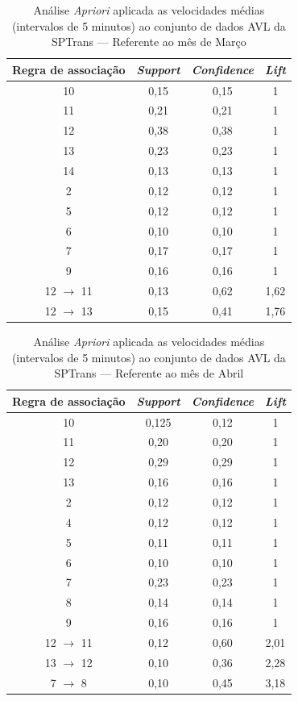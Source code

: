 \documentclass[
	12pt,				%
	oneside,			%
	a4paper,			%
	english,			%
	brazil				%
	]{abntex2ppgsi}
\begin{document}
{{\begin{apendicesenv}
\begin{table}[!htb]
\centering
\caption {Análise \textit{Apriori} aplicada as velocidades médias (intervalos de 5 minutos) ao conjunto de dados AVL da SPTrans --- Referente ao mês de Março}
\label {tab:aprioriMarch}
\begin{tabular}{c|c|c|c}
\toprule
\textbf{Regra de associação} & \textit{\textbf{Support}} & \textit{\textbf{Confidence}} & \textit{\textbf{Lift}} \\
\midrule 
10 &  0,15 &  0,15 &  1\\ 
\hline 
11 &  0,21 &  0,21 &  1\\ 
\hline 
12 &  0,38 &  0,38 &  1\\ 
\hline 
13 &  0,23 &  0,23 &  1\\ 
\hline 
14 &  0,13 &  0,13 &  1\\ 
\hline 
2 &  0,12 &  0,12 &  1\\ 
\hline 
5 &  0,12 &  0,12 &  1\\ 
\hline 
6 &  0,10 &  0,10 &  1\\ 
\hline 
7 &  0,17 &  0,17 &  1\\ 
\hline 
9 &  0,16 &  0,16 &  1\\ 
\hline 
12 $\rightarrow$ 11 &  0,13 &  0,62 &  1,62\\ 
\hline 
12 $\rightarrow$ 13 &  0,15 &  0,41 &  1,76\\
\bottomrule
\end{tabular}
\end{table}


\begin{table}[!htb]
\centering
\caption {Análise \textit{Apriori} aplicada as velocidades médias (intervalos de 5 minutos) ao conjunto de dados AVL da SPTrans --- Referente ao mês de Abril}
\label {tab:aprioriApril}
\begin{tabular}{c|c|c|c}
\toprule
\textbf{Regra de associação} & \textit{\textbf{Support}} & \textit{\textbf{Confidence}} & \textit{\textbf{Lift}} \\
\midrule 
10 &  0,125 &  0,12 &  1\\
\hline
11 &  0,20 &  0,20 &  1\\
\hline
12 &  0,29 &  0,29 &  1\\
\hline
13 &  0,16 &  0,16 &  1\\
\hline
2 &  0,12 &  0,12 &  1\\
\hline
4 &  0,12 &  0,12 &  1\\
\hline
5 &  0,11 &  0,11 &  1\\
\hline
6 &  0,10 &  0,10 &  1\\
\hline
7 &  0,23 &  0,23 &  1\\
\hline
8 &  0,14 &  0,14 &  1\\
\hline
9 &  0,16 &  0,16 &  1\\
\hline
12  $\rightarrow$ 11 &  0,12 &  0,60 &  2,01\\
\hline
13  $\rightarrow$ 12 &  0,10 &  0,36&  2,28\\
\hline
7  $\rightarrow$ 8 &  0,10 &  0,45 &  3,18\\
\bottomrule
\end{tabular}
\end{table}


\end{apendicesenv}}}
\end{document}
